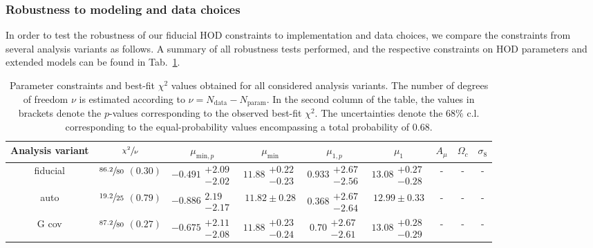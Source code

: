 \documentclass[a4paper,11pt]{article}
\newcommand\Tstrut{\rule{0pt}{3ex}}
\begin{document}
    \subsubsection{Robustness to modeling and data choices}
      In order to test the robustness of our fiducial HOD constraints to implementation and data choices, we compare the constraints from several analysis variants as follows. A summary of all robustness tests performed, and the respective constraints on HOD parameters and extended models can be found in Tab.~\ref{tab:constraints_robustness}.

      \begin{table}
        \caption{Parameter constraints and best-fit $\chi^{2}$ values obtained for all considered analysis variants. The number of degrees of freedom $\nu$ is estimated according to $\nu = N_{\mathrm{data}}-N_{\mathrm{param}}$. In the second column of the table, the values in brackets denote the $p$-values corresponding to the observed best-fit $\chi^{2}$. The uncertainties denote the $68 \%$ c.l. corresponding to the equal-probability values encompassing a total probability of 0.68.} \label{tab:constraints_robustness}
        \begin{center}
          \begin{tabular}{ccccccccc}
            \hline\hline 
            Analysis variant & $\sfrac{\chi^{2}}{\nu}$ & $\mu_{\mathrm{min}, p}$ & $\mu_{\mathrm{min}}$ & $\mu_{1, p}$ & $\mu_{1}$ & $A_{\mu}$ & $\Omega_{c}$ & $\sigma_{8}$ \\ \hline \Tstrut       
            fiducial & $\sfrac{86.2}{80}$ $(0.30)$ & $-0.491\substack{+2.09 \\ -2.02}$ & $11.88\substack{+0.22 \\ -0.23}$ & $0.933\substack{+2.67 \\ -2.56}$ & $13.08\substack{+0.27 \\ -0.28}$ & - & - & - \\
            auto & $\sfrac{19.2}{25}$ $(0.79)$ & $-0.886\substack{2.19 \\ -2.17}$ & $11.82 \pm 0.28$ & $0.368\substack{+2.67 \\ -2.64}$ & $12.99 \pm 0.33$  & - & - & - \\
            G cov & $\sfrac{87.2}{80}$ $(0.27)$ & $-0.675\substack{+2.11 \\ -2.08}$ & $11.88\substack{+0.23 \\ -0.24}$ & $0.70\substack{+2.67 \\ -2.61}$ & $13.08\substack{+0.28 \\ -0.29}$ & - & - & - \\

\end{tabular}
\end{center}
\end{table}
\end{document}
